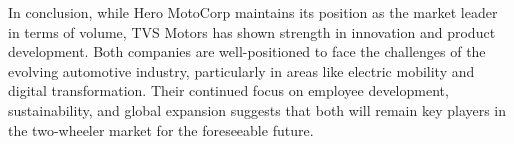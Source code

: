 In conclusion, while Hero MotoCorp maintains its position as the market leader in terms of volume, TVS Motors has shown strength in innovation and product development. Both companies are well-positioned to face the challenges of the evolving automotive industry, particularly in areas like electric mobility and digital transformation. Their continued focus on employee development, sustainability, and global expansion suggests that both will remain key players in the two-wheeler market for the foreseeable future.